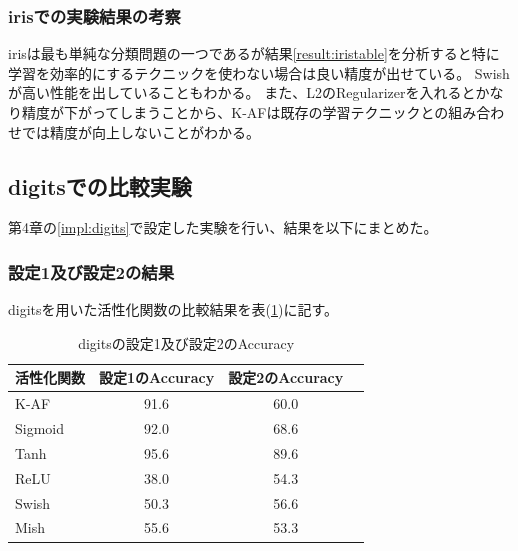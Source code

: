 \subsubsection{irisでの実験結果の考察}


irisは最も単純な分類問題の一つであるが結果\ref{result:iristable}を分析すると特に学習を効率的にするテクニックを使わない場合は良い精度が出せている。
Swishが高い性能を出していることもわかる。
また、L2のRegularizerを入れるとかなり精度が下がってしまうことから、K-AFは既存の学習テクニックとの組み合わせでは精度が向上しないことがわかる。






\subsection{digitsでの比較実験}
\label{ev:digitsでの比較実験}
第4章の\ref{impl:digits}で設定した実験を行い、結果を以下にまとめた。
\subsubsection{設定1及び設定2の結果}
\label{digits:result}

digitsを用いた活性化関数の比較結果を表(\ref{result:digitstable})に記す。

\begin{table}[htbp]
    \begin{center}
        \caption{digitsの設定1及び設定2のAccuracy}
        \label{result:digitstable}
        \vspace{2mm} 
        \begin{tabular}{l*{2}{c}r}
            活性化関数              & 設定1のAccuracy &  設定2のAccuracy \\
            \hline
            K-AF            & 91.6 & 60.0 \\
            Sigmoid            & 92.0 & 68.6\\
            Tanh            & 95.6 & 89.6 \\
            ReLU        & 38.0 & 54.3 \\
            Swish           & 50.3 & 56.6 \\
            Mish           & 55.6 & 53.3 \\
    
        \end{tabular}
    \end{center}
\end{table}


